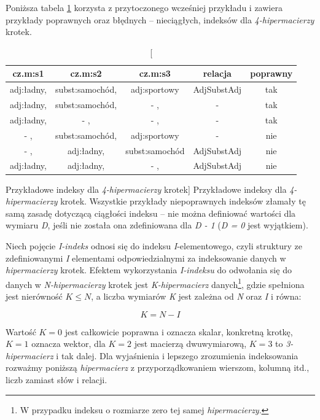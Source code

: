 \documentclass[11pt,a4paper]{llncs}
\begin{document}
Poniższa tabela \ref{hypermatrix_indices} korzysta z przytoczonego wcześniej przykładu i zawiera przykłady poprawnych oraz błędnych -- nieciągłych, indeksów dla \emph{4-hipermacierzy} krotek.

\begin{table}[h!]
\centering
\begin{tabular}{c c c c c}
\toprule
\textbf{cz.m:s1} & \textbf{cz.m:s2} & \textbf{cz.m:s3} & \textbf{relacja}  & \textbf{poprawny} \\
\midrule
adj:ładny, 	& subst:samochód, 	& adj:sportowy		& AdjSubstAdj	& tak \\
adj:ładny, 	& subst:samochód, 	& - ,			& -		& tak \\
adj:ładny,	& - ,			& - ,			& -		& tak \\
- ,		& subst:samochód, 	& adj:sportowy 		& -		& nie \\
- ,		& adj:ładny,		& subst:samochód	& AdjSubstAdj	& nie \\
adj:ładny,	& adj:ładny,		& - ,			& AdjSubstAdj	& nie \\
\bottomrule
\end{tabular}
\caption
	[Przykładowe indeksy dla \emph{4-hipermacierzy} krotek]
	{Przykładowe indeksy dla \emph{4-hipermacierzy} krotek. Wszystkie przykłady niepoprawnych indeksów złamały tę samą zasadę dotyczącą ciągłości indeksu -- nie można definiować wartości dla wymiaru \emph{D}, jeśli nie została ona zdefiniowana dla \emph{D - 1} (\emph{D = 0} jest wyjątkiem).}
\label{hypermatrix_indices}
\end{table}


Niech pojęcie \emph{I-indeks} odnosi się do indeksu \emph{I}-elementowego, czyli struktury ze zdefiniowanymi \emph{I} elementami odpowiedzialnymi za indeksowanie danych w \emph{hipermacierzy} krotek.
Efektem wykorzystania \emph{I-indeksu} do odwołania się do danych w \emph{N-hipermacierzy} krotek jest \emph{K-hipermacierz} danych\footnote{W przypadku indeksu o rozmiarze zero tej samej \emph{hipermacierzy}.}, gdzie spełniona jest nierówność $ K \leq N $, a liczba wymiarów \emph{K} jest zależna od \emph{N} oraz \emph{I} i równa:

$$ K = N - I $$

Wartość $K = 0$ jest całkowicie poprawna i oznacza skalar, konkretną krotkę, $K = 1$ oznacza wektor, dla $K = 2$ jest macierzą dwuwymiarową, $K = 3$ to \emph{3-hipermacierz} i tak dalej.
Dla wyjaśnienia i lepszego zrozumienia indeksowania rozważmy poniższą \emph{hipermacierz} z przyporządkowaniem wierszom, kolumną itd., liczb zamiast słów i relacji.
\end{document}
